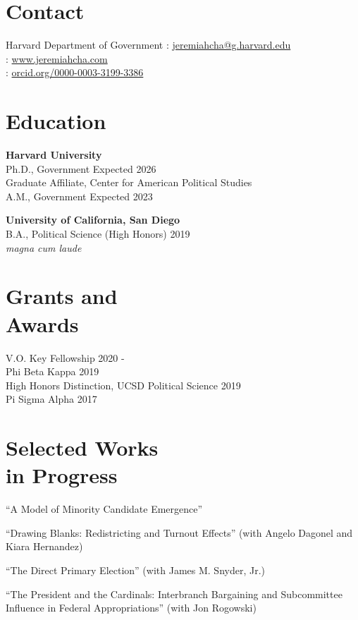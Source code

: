 \documentclass[margin, line]{res}
\begin{document}
\begin{resume}

\section{Contact}
Harvard Department of Government \hfill \Letter: \href{mailto:jeremiahcha@g.harvard.edu}{jeremiahcha@g.harvard.edu}\\
\mbox{} \hfill \Mundus: \href{httsp://www.jeremiahcha.com}{www.jeremiahcha.com}\\
\mbox{} \hfill \Mundus: \href{https://orcid.org/0000-0003-3199-3386}{orcid.org/0000-0003-3199-3386}

\section{Education}
\textbf{Harvard University}\\
\hspace*{5mm} Ph.D., Government \hfill Expected 2026\\
\hspace*{10mm}Graduate Affiliate, Center for American Political Studies\\
\hspace*{5mm} A.M., Government \hfill Expected 2023

\textbf{University of California, San Diego}\\
\hspace*{5mm} B.A., Political Science (High Honors) \hfill 2019\\
\hspace*{10mm} \textit{magna cum laude}

\section{Grants and \\Awards}
V.O. Key Fellowship \hfill 2020 - \\
Phi Beta Kappa \hfill 2019\\
High Honors Distinction, UCSD Political Science \hfill 2019\\
Pi Sigma Alpha \hfill 2017

\section{Selected Works \\in Progress}
\begin{etaremune}
	\item ``A Model of Minority Candidate Emergence''
	\item ``Drawing Blanks: Redistricting and Turnout Effects'' (with Angelo Dagonel and Kiara Hernandez)
	\item ``The Direct Primary Election'' (with James M. Snyder, Jr.)
	\item ``The President and the Cardinals: Interbranch Bargaining and Subcommittee Influence in Federal Appropriations'' (with Jon Rogowski)
\end{etaremune}


\end{resume}
\end{document}
